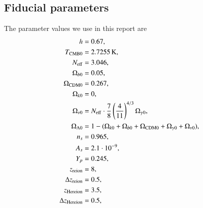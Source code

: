 
% 


\begin{appendix}
\section{Fiducial parameters} \label{app:M1:fiducial_parameters}
The parameter values we use in this report are 
\begin{equation} \label{eq:Appendix:Fiducial_cosmology_parameters}
      \begin{split}
            h &= 0.67, \\ 
            T_\mathrm{CMB0} &= 2.7255\,\mathrm{K}, \\
            N_\mathrm{eff} &= 3.046, \\
            \Omega_{b0} &= 0.05, \\
            \Omega_\mathrm{CDM0} &= 0.267,\\
            \Omega_{k0} &=0,\\
            \Omega_{\nu 0} &= N_\mathrm{eff} \cdot \frac{7}{8} \left( \frac{4}{11} \right)^{4/3} \Omega_{\gamma 0}, \\
            \Omega_{\Lambda 0} &= 1 - (\Omega_{k0} + \Omega_{b0} + \Omega_\mathrm{CDM0} + \Omega_{\gamma 0} + \Omega_{\nu 0}), \\
            n_s &= 0.965,\\
            A_s &= 2.1\cdot 10^{-9},\\
            Y_p &= 0.245, \\
            z_\mathrm{reion} &= 8, \\
            \Delta z_\mathrm{reion} &= 0.5, \\
            z_\mathrm{Hereion} &= 3.5, \\
            \Delta z_\mathrm{Hereion} &= 0.5, \\
      \end{split}
\end{equation}


\end{appendix}


